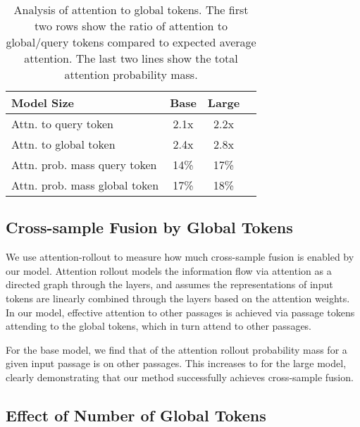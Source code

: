 \documentclass[11pt]{article}
\begin{document}
\begin{table}[h!]
\begin{center}
\begin{tabular}{lccc}
\toprule
\textbf{Model Size} & \textbf{Base} & \textbf{Large}\\ 
\toprule 
Attn. to query token & 2.1x & 2.2x \\
Attn. to global token & 2.4x & 2.8x \\
Attn. prob. mass query token & 14\% & 17\% \\
Attn. prob. mass global token & 17\% & 18\% \\
\bottomrule
\end{tabular}
\end{center}
\caption{Analysis of attention to global tokens. The first two rows show the ratio of attention to global/query tokens compared to expected average attention. The last two lines show the total attention probability mass.}
\label{tab_glo_ana_attn}
\end{table}

\subsection{Cross-sample Fusion by Global Tokens}

We use attention-rollout \cite{attn_flow} to measure how much cross-sample fusion is enabled by our model. Attention rollout models the information flow via attention as a directed graph through the layers, and assumes the representations of input tokens are linearly combined through the layers based on the attention weights. In our model, effective attention to other passages is achieved via passage tokens attending to the global tokens, which in turn attend to other passages. 

For the base model, we find that  of the attention rollout probability mass for a given input passage is on other passages. This increases to  for the large model, clearly demonstrating that our method successfully achieves cross-sample fusion.

\subsection{Effect of Number of Global Tokens}
\end{document}
